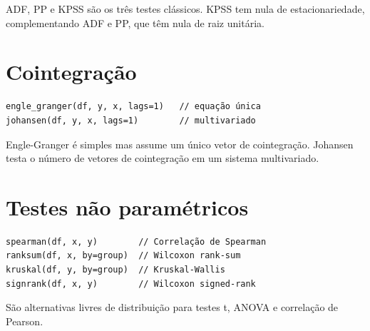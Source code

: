 ADF, PP e KPSS são os três testes clássicos. KPSS tem nula de
estacionariedade, complementando ADF e PP, que têm nula de raiz
unitária.

\section{Cointegração}

\begin{lstlisting}[caption={Testes de cointegração}]
engle_granger(df, y, x, lags=1)   // equação única
johansen(df, y, x, lags=1)        // multivariado
\end{lstlisting}

Engle-Granger é simples mas assume um único vetor de cointegração.
Johansen testa o número de vetores de cointegração em um sistema
multivariado.

\section{Testes não paramétricos}

\begin{lstlisting}[caption={Testes não paramétricos}]
spearman(df, x, y)        // Correlação de Spearman
ranksum(df, x, by=group)  // Wilcoxon rank-sum
kruskal(df, y, by=group)  // Kruskal-Wallis
signrank(df, x, y)        // Wilcoxon signed-rank
\end{lstlisting}

São alternativas livres de distribuição para testes t, ANOVA e
correlação de Pearson.
